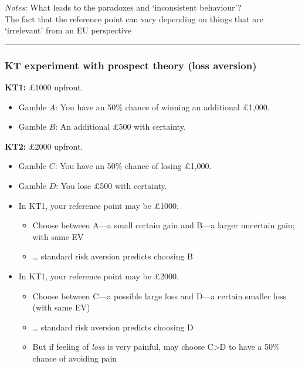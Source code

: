 \documentclass[]{article}
\providecommand{\tightlist}{%
  \setlength{\itemsep}{0pt}\setlength{\parskip}{0pt}}
\begin{document}
\emph{Notes:} What leads to the paradoxes and `inconsistent
behaviour'?\\
The fact that the reference point can vary depending on things that are
`irrelevant' from an EU perspective

\begin{center}\rule{0.5\linewidth}{\linethickness}\end{center}

\hypertarget{kt-experiment-with-prospect-theory-loss-aversion}{%
\subsubsection{KT experiment with prospect theory (loss
aversion)}\label{kt-experiment-with-prospect-theory-loss-aversion}}

\textbf{KT1:} \pounds1000 upfront.\\

\begin{itemize}
\tightlist
\item
  Gamble \(A\): You have an 50\% chance of winning an additional
  \pounds1,000.
\item
  Gamble \(B\): An additional \pounds500 with certainty.
\end{itemize}

\bigskip

\hrulefill

\textbf{KT2:} \pounds2000 upfront.\\

\begin{itemize}
\tightlist
\item
  Gamble \(C\): You have an 50\% chance of losing \pounds1,000.
\item
  Gamble \(D\): You lose \pounds500 with certainty.
\end{itemize}

\hrulefill

\bigskip

\begin{itemize}
\tightlist
\item
  In KT1, your reference point may be \pounds1000.

  \begin{itemize}
  \tightlist
  \item
    Choose between A---a small certain gain and B---a larger uncertain
    gain; with same EV
  \item
    \ldots{} standard risk aversion predicts choosing B
  \end{itemize}
\item
  In KT1, your reference point may be \pounds2000.

  \begin{itemize}
  \tightlist
  \item
    Choose between C---a possible large loss and D---a certain smaller
    loss (with same EV)
  \item
    \ldots{} standard risk aversion predicts choosing D
  \item
    But if feeling of \emph{loss} is very painful, may choose
    C\textgreater D to have a 50\% chance of avoiding pain
  \end{itemize}
\end{itemize}
\end{document}
